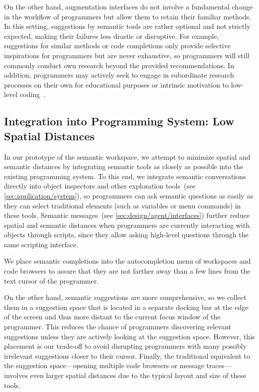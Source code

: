 On the other hand, augmentation interfaces do not involve a fundamental change in the workflow of programmers but allow them to retain their familiar methods.
In this setting, suggestions by semantic tools are rather optional and not strictly expected, making their failures less drastic or disruptive.
For example, suggestions for similar methods or code completions only provide selective inspirations for programmers but are never exhaustive, so programmers will still commonly conduct own research beyond the provided recommendations.
In addition, programmers may actively seek to engage in subordinate research processes on their own for educational purposes or intrinsic motivation to low-level coding~\cite{tanimoto2023five}.

\subsection{Integration into Programming System: Low Spatial Distances}
\label{sec:discussion/experience/integration}

In our prototype of the semantic workspace, we attempt to minimize spatial and semantic distances by integrating semantic tools as closely as possible into the existing programming system.
To this end, we integrate semantic conversations directly into object inspectors and other exploration tools~(see \cref{sec:application/system}), so programmers can ask semantic questions as easily as they can select traditional elements (such as variables or menu commands) in these tools.
Semantic messages~(see \cref{sec:design/agent/interfaces}) further reduce spatial and semantic distances when programmers are currently interacting with objects through scripts, since they allow asking high-level questions through the same scripting interface.

We place semantic completions into the autocompletion menu of workspaces and code browsers to assure that they are not farther away than a few lines from the text cursor of the programmer.

On the other hand, semantic suggestions are more comprehensive, so we collect them in a suggestion space that is located in a separate docking bar at the edge of the screen and thus more distant to the current focus window of the programmer.
This reduces the chance of programmers discovering relevant suggestions unless they are actively looking at the suggestion space.
However, this placement is our trade-off to avoid disrupting programmers with many possibly irrelevant suggestions closer to their cursor.
Finally, the traditional equivalent to the suggestion space---opening multiple code browsers or message traces---involves even larger spatial distances due to the typical layout and size of these tools.

